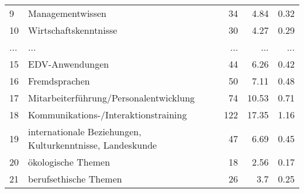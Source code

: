 \begin{longtable}{lXrrr}
        9 & \multicolumn{1}{X}{Managementwissen} & %
          \num{34} &
          \num[round-mode=places,round-precision=2]{4,84} &
          \num[round-mode=places,round-precision=2]{0,32} \\
        10 & \multicolumn{1}{X}{Wirtschaftskenntnisse} & %
          \num{30} &
          \num[round-mode=places,round-precision=2]{4,27} &
          \num[round-mode=places,round-precision=2]{0,29} \\
       ... & ... & ... & ... & ... \\
        15 & \multicolumn{1}{X}{EDV-Anwendungen} & %
          \num{44} &
          \num[round-mode=places,round-precision=2]{6,26} &
          \num[round-mode=places,round-precision=2]{0,42} \\

        16 & \multicolumn{1}{X}{Fremdsprachen} & %
          \num{50} &
          \num[round-mode=places,round-precision=2]{7,11} &
          \num[round-mode=places,round-precision=2]{0,48} \\

        17 & \multicolumn{1}{X}{Mitarbeiterführung/Personalentwicklung} & %
          \num{74} &
          \num[round-mode=places,round-precision=2]{10,53} &
          \num[round-mode=places,round-precision=2]{0,71} \\

        18 & \multicolumn{1}{X}{Kommunikations-/Interaktionstraining} & %
          \num{122} &
          \num[round-mode=places,round-precision=2]{17,35} &
          \num[round-mode=places,round-precision=2]{1,16} \\

        19 & \multicolumn{1}{X}{internationale Beziehungen, Kulturkenntnisse, Landeskunde} & %
          \num{47} &
          \num[round-mode=places,round-precision=2]{6,69} &
          \num[round-mode=places,round-precision=2]{0,45} \\

        20 & \multicolumn{1}{X}{ökologische Themen} & %
          \num{18} &
          \num[round-mode=places,round-precision=2]{2,56} &
          \num[round-mode=places,round-precision=2]{0,17} \\

        21 & \multicolumn{1}{X}{berufsethische Themen} & %
          \num{26} &
          \num[round-mode=places,round-precision=2]{3,7} &
          \num[round-mode=places,round-precision=2]{0,25} \\


\end{longtable}
